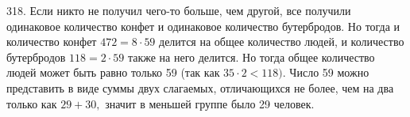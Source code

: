 318. Если никто не получил чего-то больше, чем другой, все получили одинаковое количество конфет и одинаковое количество бутербродов. Но тогда и количество конфет $472=8\cdot59$ делится на общее количество людей, и количество бутербродов $118=2\cdot59$ также на него делится. Но тогда общее количество людей может быть равно только 59 (так как $35\cdot2<118).$ Число 59 можно представить в виде суммы двух слагаемых, отличающихся не более, чем на два только как $29+30,$ значит в меньшей группе было 29 человек.\\
